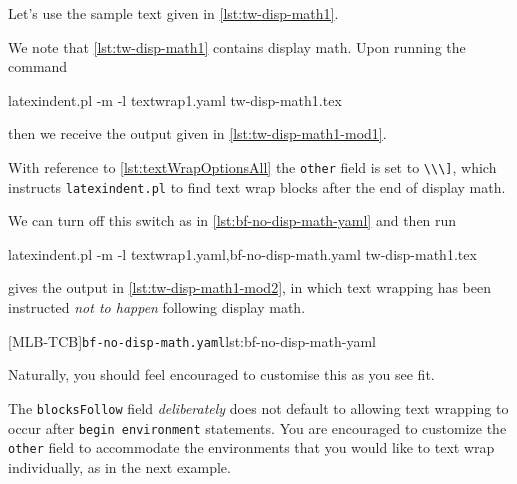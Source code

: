  \begin{example}
 Let's use the sample text given in \cref{lst:tw-disp-math1}.  


 We note that \cref{lst:tw-disp-math1} contains display math. Upon running the command

 \begin{commandshell}
latexindent.pl -m -l textwrap1.yaml tw-disp-math1.tex
\end{commandshell}

 then we receive the output given in \cref{lst:tw-disp-math1-mod1}.


 With reference to \vref{lst:textWrapOptionsAll} the \texttt{other} field is set to
 \lstinline!\\\]!, which instructs \texttt{latexindent.pl} to find text wrap blocks after
 the end of display math.

 We can turn off this switch as in \cref{lst:bf-no-disp-math-yaml} and then run
 \begin{widepage}

  \begin{commandshell}
latexindent.pl -m -l textwrap1.yaml,bf-no-disp-math.yaml tw-disp-math1.tex
\end{commandshell}

 \end{widepage}
 gives the output in \cref{lst:tw-disp-math1-mod2}, in which text wrapping has been
 instructed \emph{not to happen} following display math.
 \begin{cmhtcbraster}[raster column skip=.1\linewidth]
  [MLB-TCB]{\texttt{bf-no-disp-math.yaml}}{lst:bf-no-disp-math-yaml}
 \end{cmhtcbraster}

 Naturally, you should feel encouraged to customise this as you see fit.
 \end{example}

 The \texttt{blocksFollow} field \emph{deliberately} does not default to allowing text
 wrapping to occur after \texttt{begin environment} statements. You are encouraged to
 customize the \texttt{other} field to accommodate the environments that you would like
 to text wrap individually, as in the next example.

